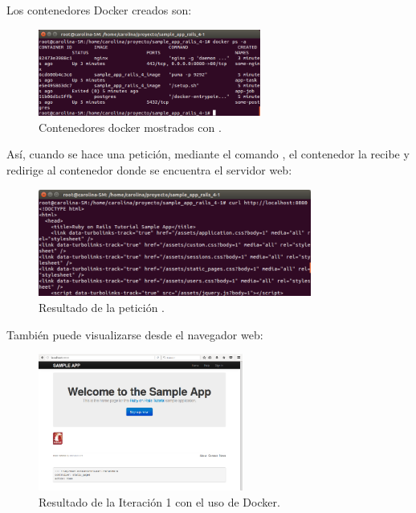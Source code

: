 Los contenedores Docker creados son:

\begin{figure}[H]
\centering
\includegraphics[width=0.65\textwidth]{images/figures/dockerps.png}
\caption{Contenedores docker mostrados con .}
\end{figure}

Así, cuando se hace una petición, mediante el comando , el contenedor  la recibe y redirige al contenedor  donde se encuentra el servidor web:


\begin{figure}[H]
\centering
\includegraphics[width=0.8\textwidth]{images/figures/curldocker.png}
\caption{Resultado de la petición .}
\end{figure}

También puede visualizarse desde el navegador web:
\begin{figure}[H]
\centering
\includegraphics[width=0.6\textwidth]{images/figures/resultado1.png}
\caption{Resultado de la Iteración 1 con el uso de Docker. \label{fig:resultado1}}
\end{figure}

